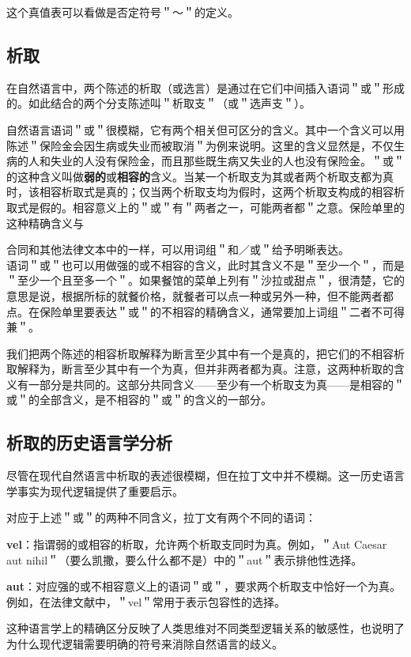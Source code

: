 这个真值表可以看做是否定符号＂～＂的定义。

\subsection{析取}
在自然语言中，两个陈述的析取（或选言）是通过在它们中间插入语词＂或＂形成的。如此结合的两个分支陈述叫＂析取支＂（或＂选声支＂）。

自然语言语词＂或＂很模糊，它有两个相关但可区分的含义。其中一个含义可以用陈述＂保险金会因生病或失业而被取消＂为例来说明。这里的含义显然是，不仅生病的人和失业的人没有保险金，而且那些既生病又失业的人也没有保险金。＂或＂的这种含义叫做\textbf{弱的}或\textbf{相容的}含义。当某一个析取支为其或者两个析取支都为真时，该相容析取式是真的；仅当两个析取支均为假时，这两个析取支构成的相容析取式是假的。相容意义上的＂或＂有＂两者之一，可能两者都＂之意。保险单里的这种精确含义与

合同和其他法律文本中的一样，可以用词组＂和／或＂给予明晰表达。\\
语词＂或＂也可以用做强的或不相容的含义，此时其含义不是＂至少一个＂，而是＂至少一个且至多一个＂。如果餐馆的菜单上列有＂沙拉或甜点＂，很清楚，它的意思是说，根据所标的就餐价格，就餐者可以点一种或另外一种，但不能两者都点。在保险单里要表达＂或＂的不相容的精确含义，通常要加上词组＂二者不可得兼＂。

我们把两个陈述的相容析取解释为断言至少其中有一个是真的，把它们的不相容析取解释为，断言至少其中有一个为真，但并非两者都为真。注意，这两种析取的含义有一部分是共同的。这部分共同含义——至少有一个析取支为真——是相容的＂或＂的全部含义，是不相容的＂或＂的含义的一部分。

\subsection{析取的历史语言学分析}

尽管在现代自然语言中析取的表述很模糊，但在拉丁文中并不模糊。这一历史语言学事实为现代逻辑提供了重要启示。

\begin{examplebox}[title=拉丁语中的析取区分]
对应于上述＂或＂的两种不同含义，拉丁文有两个不同的语词：

\textbf{vel}：指谓弱的或相容的析取，允许两个析取支同时为真。例如，＂Aut Caesar aut nihil＂（要么凯撒，要么什么都不是）中的＂aut＂表示排他性选择。

\textbf{aut}：对应强的或不相容意义上的语词＂或＂，要求两个析取支中恰好一个为真。例如，在法律文献中，＂vel＂常用于表示包容性的选择。

这种语言学上的精确区分反映了人类思维对不同类型逻辑关系的敏感性，也说明了为什么现代逻辑需要明确的符号来消除自然语言的歧义。
\end{examplebox}

